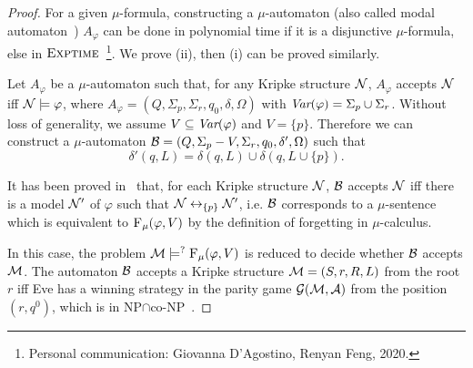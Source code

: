 \documentclass[runningheads]{llncs}
\begin{document}
\begin{proof}
For a given $\mu$-formula, constructing a $\mu$-automaton (also called modal automaton~\cite{bradfield2018mu}) $A_{\varphi}$ can be done in polynomial time if it is a disjunctive $\mu$-formula, else in $\textsc{Exptime}$~\footnote{Personal communication: Giovanna D'Agostino, Renyan Feng, 2020.}.
We prove (ii), then (i) can be proved similarly.

Let $A_{\varphi}$ be a $\mu$-automaton such that, for any Kripke structure ${\cal N}$, %
$A_{\varphi}$ accepts ${\cal N}$ iff ${\cal N} \models \varphi$, where $A_{\varphi} = (Q, \Sigma_p, \Sigma_r, q_0, \delta, \Omega)$ with $\textit{Var}(\varphi) = \Sigma_p \cup \Sigma_r$. Without loss of generality, we assume $V \subseteq \textit{Var}(\varphi)$ and $V=\{p\}$.  Therefore we can construct  a $\mu$-automaton ${\cal B}= (Q, \Sigma_p - V, \Sigma_r, q_0, \delta', \Omega)$ such that
\[
    \delta'(q, L) = \delta(q, L) \cup \delta(q, L \cup \{p\}).
\]

It has been proved in~\cite{d1996uniform} that, for each Kripke structure ${\cal N}$,  ${\cal B}$ accepts ${\cal N}$ iff there is a model ${\cal N}'$ of $\varphi$ such that ${\cal N} \leftrightarrow_{\{p\}} {\cal N}'$, i.e. ${\cal B}$ corresponds to a $\mu$-sentence which is equivalent to ${\textsc{F}_{\textsc{$\mu$}}}(\varphi, V)$ by the definition of forgetting in $\mu$-calculus.


In this case, the problem ${\cal M} \models^? {\textsc{F}_{\textsc{$\mu$}}}(\varphi, V)$ is reduced to decide whether ${\cal B}$ accepts ${\cal M}$.
The automaton ${\cal B}$ accepts a Kripke structure ${\cal M}=(S, r, R,L)$ from the root $r$ iff Eve has a winning strategy in the parity game ${\cal G}({\cal M}, {\cal A})$ from the position $(r,q^0)$, which is in \textsc{NP}$\cap$co-\textsc{NP}~\cite{bradfield2018mu}.
\end{proof}
\end{document}
